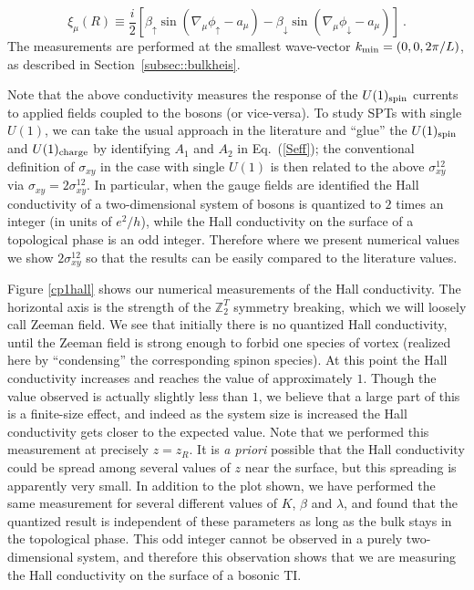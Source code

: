 \documentclass[prb,twocolumn]{revtex4-1}
\def\ztwot{\mathbb{Z}_2^T}
\begin{document}
\begin{equation}
\xi_\mu(R)\equiv\frac{i}{2}\left[\beta_\uparrow\sin(\nabla_\mu\phi_\uparrow-a_\mu)-\beta_\downarrow\sin(\nabla_\mu\phi_\downarrow-a_\mu)\right]\nonumber ~.
\end{equation}
The measurements are performed at the smallest wave-vector $k_{\rm min}=(0,0, 2\pi/L)$, as described in Section~\ref{subsec::bulkheis}. 

Note that the above conductivity measures the response of the $U(1)_{\rm spin}$ currents to applied fields coupled to the bosons (or vice-versa). To study SPTs with single $U(1)$, we can take the usual approach in the literature\cite{SenthilVishwanath} and ``glue'' the $U(1)_{\rm spin}$ and $U(1)_{\rm charge}$ by identifying $A_1$ and $A_2$ in Eq.~(\ref{Seff}); the conventional definition of $\sigma_{xy}$ in the case with single $U(1)$ is then related to the above $\sigma_{xy}^{12}$ via  $\sigma_{xy} = 2 \sigma_{xy}^{12}$. %
In particular, when the gauge fields are identified the Hall conductivity of a two-dimensional system of bosons is quantized to $2$ times an integer (in units of $e^2/h$), while the Hall conductivity on the surface of a topological phase is an odd integer. Therefore where we present numerical values we show $2 \sigma^{12}_{xy}$ so that the results can be easily compared to the literature values.


Figure \ref{cp1hall} shows our numerical measurements of the Hall conductivity. The horizontal axis is the strength of the $\ztwot$ symmetry breaking, which we will loosely call Zeeman field. We see that initially there is no quantized Hall conductivity, until the Zeeman field is strong enough to forbid one species of vortex (realized here by ``condensing'' the corresponding spinon species). At this point the Hall conductivity increases and reaches the value of approximately $1$. Though the value observed is actually slightly less than $1$, we believe that a large part of this is a finite-size effect, and indeed as the system size is increased the Hall conductivity gets closer to the expected value.  Note that we performed this measurement at precisely $z=z_R$.  It is {\em a priori} possible that the Hall conductivity could be spread among several values of $z$ near the surface, but this spreading is apparently very small. In addition to the plot shown, we have performed the same measurement for several different values of $K$, $\beta$ and $\lambda$, and found that the quantized result is independent of these parameters as long as the bulk stays in the topological phase. This odd integer cannot be observed in a purely two-dimensional system, and therefore this observation shows that we are measuring the Hall conductivity on the surface of a bosonic TI.
\end{document}
